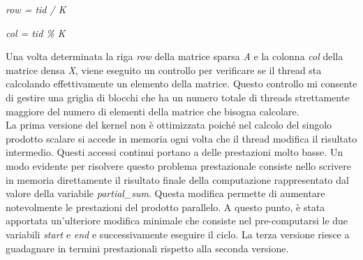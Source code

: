\documentclass{article}
\begin{document}
\begin{center}
\item \textit{row = tid / K}
\item \textit{col = tid \% K}
\end{center}

Una volta determinata la riga \textit{row} della matrice sparsa \textit{A} e la colonna \textit{col} della matrice densa \textit{X}, viene eseguito un controllo per verificare se il thread sta calcolando effettivamente un elemento della matrice. Questo controllo mi consente di gestire una griglia di blocchi che ha un numero totale di threads strettamente maggiore del numero di elementi della matrice che bisogna calcolare.\\
La prima versione del kernel non è ottimizzata poiché nel calcolo del singolo prodotto scalare si accede in memoria ogni volta che il thread modifica il risultato intermedio. Questi accessi continui portano a delle prestazioni molto basse. Un modo evidente per risolvere questo problema prestazionale consiste nello scrivere in memoria direttamente il risultato finale della computazione rappresentato dal valore della variabile \textit{partial\_sum}. Questa modifica permette di aumentare notevolmente le prestazioni del prodotto parallelo. A questo punto, è stata apportata un'ulteriore modifica minimale che consiste nel pre-computarsi le due variabili \textit{start} e \textit{end} e successivamente eseguire il ciclo. La terza versione riesce a guadagnare in termini prestazionali rispetto alla seconda versione.\\
\end{document}
